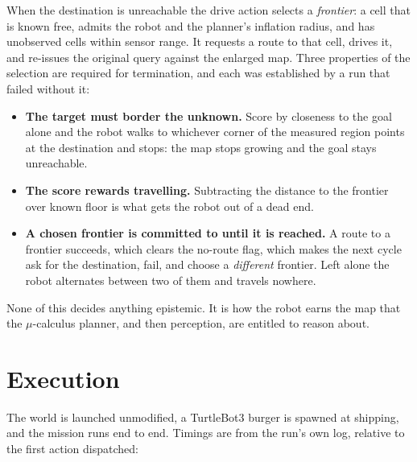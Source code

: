 \documentclass[11pt,a4paper]{article}
\theoremstyle{definition}
\begin{document}
When the destination is unreachable the drive action selects a
\emph{frontier}: a cell that is known free, admits the robot and the planner's
inflation radius, and has unobserved cells within sensor range. It requests a
route to that cell, drives it, and re-issues the original query against the
enlarged map. Three properties of the selection are required for termination,
and each was established by a run that failed without it:

\begin{itemize}[leftmargin=1.2em]
\item \textbf{The target must border the unknown.} Score by closeness to the
goal alone and the robot walks to whichever corner of the measured region
points at the destination and stops: the map stops growing and the goal stays
unreachable.
\item \textbf{The score rewards travelling.} Subtracting the distance to the
frontier over known floor is what gets the robot out of a dead end.
\item \textbf{A chosen frontier is committed to until it is reached.} A route
to a frontier succeeds, which clears the no-route flag, which makes the next
cycle ask for the destination, fail, and choose a \emph{different} frontier.
Left alone the robot alternates between two of them and travels nowhere.
\end{itemize}

None of this decides anything epistemic. It is how the robot earns the map that
the $\mu$-calculus planner, and then perception, are entitled to reason about.

\section{Execution}

The world is launched unmodified, a TurtleBot3 burger is spawned at shipping,
and the mission runs end to end. Timings are from the run's own log, relative
to the first action dispatched:
\end{document}
